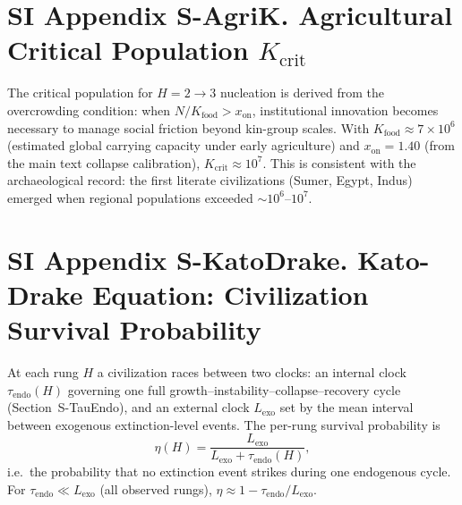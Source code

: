 \documentclass[11pt]{article}
\begin{document}

\section*{SI Appendix S-AgriK. Agricultural Critical Population $K_{\mathrm{crit}}$}

The critical population for $H=2\to 3$ nucleation is derived from the overcrowding condition: when $N/K_{\mathrm{food}} > x_{\mathrm{on}}$, institutional innovation becomes necessary to manage social friction beyond kin-group scales.
With $K_{\mathrm{food}} \approx 7\times 10^6$ (estimated global carrying capacity under early agriculture) and $x_{\mathrm{on}} = 1.40$ (from the main text collapse calibration), $K_{\mathrm{crit}} \approx 10^7$.
This is consistent with the archaeological record: the first literate civilizations (Sumer, Egypt, Indus) emerged when regional populations exceeded $\sim 10^6$--$10^7$.


\section*{SI Appendix S-KatoDrake. Kato-Drake Equation: Civilization Survival Probability}\label{sec:S-KatoDrake}

At each rung $H$ a civilization races between two clocks: an internal clock $\tau_{\mathrm{endo}}(H)$ governing one full growth--instability--collapse--recovery cycle (Section~S-TauEndo), and an external clock $L_{\mathrm{exo}}$ set by the mean interval between exogenous extinction-level events.
The per-rung survival probability is
\begin{equation}
\eta(H) = \frac{L_{\mathrm{exo}}}{L_{\mathrm{exo}} + \tau_{\mathrm{endo}}(H)},
\label{eq:eta_KD}
\end{equation}
i.e.\ the probability that no extinction event strikes during one endogenous cycle.
For $\tau_{\mathrm{endo}}\ll L_{\mathrm{exo}}$ (all observed rungs), $\eta\approx 1-\tau_{\mathrm{endo}}/L_{\mathrm{exo}}$.
\end{document}
